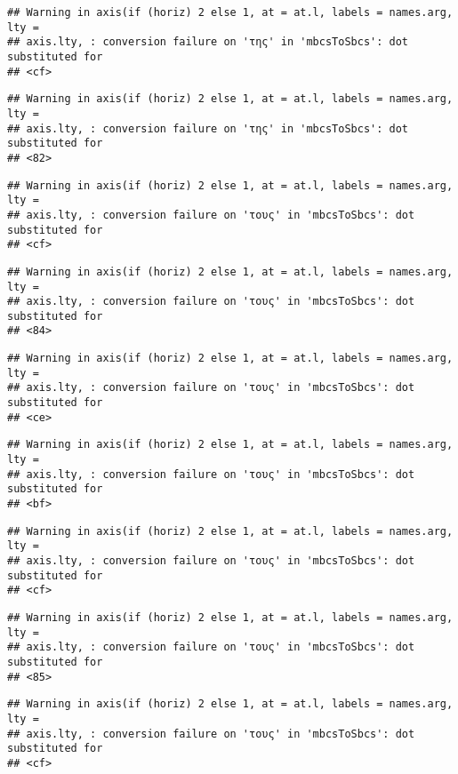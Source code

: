 \documentclass[
]{article}
\begin{document}
\begin{verbatim}
## Warning in axis(if (horiz) 2 else 1, at = at.l, labels = names.arg, lty =
## axis.lty, : conversion failure on 'της' in 'mbcsToSbcs': dot substituted for
## <cf>
\end{verbatim}

\begin{verbatim}
## Warning in axis(if (horiz) 2 else 1, at = at.l, labels = names.arg, lty =
## axis.lty, : conversion failure on 'της' in 'mbcsToSbcs': dot substituted for
## <82>
\end{verbatim}

\begin{verbatim}
## Warning in axis(if (horiz) 2 else 1, at = at.l, labels = names.arg, lty =
## axis.lty, : conversion failure on 'τους' in 'mbcsToSbcs': dot substituted for
## <cf>
\end{verbatim}

\begin{verbatim}
## Warning in axis(if (horiz) 2 else 1, at = at.l, labels = names.arg, lty =
## axis.lty, : conversion failure on 'τους' in 'mbcsToSbcs': dot substituted for
## <84>
\end{verbatim}

\begin{verbatim}
## Warning in axis(if (horiz) 2 else 1, at = at.l, labels = names.arg, lty =
## axis.lty, : conversion failure on 'τους' in 'mbcsToSbcs': dot substituted for
## <ce>
\end{verbatim}

\begin{verbatim}
## Warning in axis(if (horiz) 2 else 1, at = at.l, labels = names.arg, lty =
## axis.lty, : conversion failure on 'τους' in 'mbcsToSbcs': dot substituted for
## <bf>
\end{verbatim}

\begin{verbatim}
## Warning in axis(if (horiz) 2 else 1, at = at.l, labels = names.arg, lty =
## axis.lty, : conversion failure on 'τους' in 'mbcsToSbcs': dot substituted for
## <cf>
\end{verbatim}

\begin{verbatim}
## Warning in axis(if (horiz) 2 else 1, at = at.l, labels = names.arg, lty =
## axis.lty, : conversion failure on 'τους' in 'mbcsToSbcs': dot substituted for
## <85>
\end{verbatim}

\begin{verbatim}
## Warning in axis(if (horiz) 2 else 1, at = at.l, labels = names.arg, lty =
## axis.lty, : conversion failure on 'τους' in 'mbcsToSbcs': dot substituted for
## <cf>
\end{verbatim}
\end{document}
